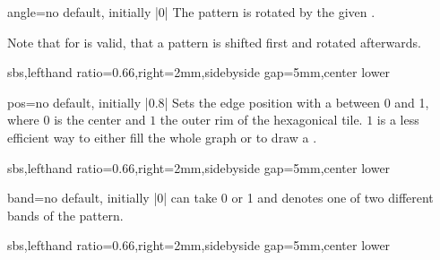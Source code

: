 \documentclass[a4paper,11pt]{article}
\begin{document}
\begin{docPatternKey}{angle}{=}{no default, initially |0|}
  The pattern is rotated by the given .
  \par
  Note that for  is valid, that a pattern is shifted first and rotated afterwards.
\begin{dispExample*}{sbs,lefthand ratio=0.66,right=2mm,sidebyside gap=5mm,center lower}
\end{dispExample*}
\end{docPatternKey}



\begin{docPatternKey}{pos}{=}{no default, initially |0.8|}
  Sets the edge position with a  between 0 and 1, where $0$ is
  the center and $1$ the outer rim of the hexagonical tile. $1$ is a less
  efficient way to either fill the whole graph or to draw a .

\begin{dispExample*}{sbs,lefthand ratio=0.66,right=2mm,sidebyside gap=5mm,center lower}
\end{dispExample*}
\end{docPatternKey}


\clearpage


\begin{docPatternKey}{band}{=}{no default, initially |0|}
   can take 0 or 1 and denotes one of two different bands of the pattern.
\begin{dispExample*}{sbs,lefthand ratio=0.66,right=2mm,sidebyside gap=5mm,center lower}
\end{dispExample*}
\end{docPatternKey}
\end{document}
